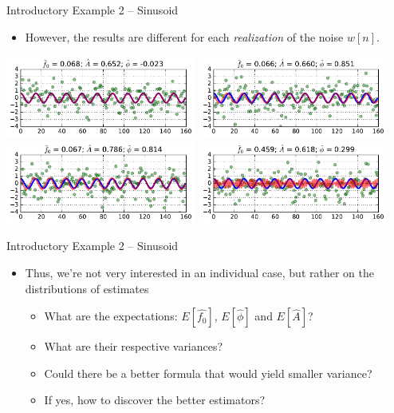 \documentclass[10pt, aspectratio=169]{beamer} %
\begin{document}
\begin{frame}{Introductory Example 2 -- Sinusoid}
 \begin{itemize}
\item However, the results are different for each \emph{realization} of the noise $w[n]$.
\end{itemize}
\begin{center}
\includegraphics[width=0.47\textwidth]{MLSinusoid1.pdf}\quad
\includegraphics[width=0.47\textwidth]{MLSinusoid2.pdf}\\
\includegraphics[width=0.47\textwidth]{MLSinusoid3.pdf}\quad
\includegraphics[width=0.47\textwidth]{MLSinusoid4.pdf}
\end{center}
\end{frame}

\begin{frame}[allowframebreaks=0.8]{Introductory Example 2 -- Sinusoid}
 \begin{itemize}


\item Thus, we're not very interested in an individual case, but rather on the distributions of estimates
 \begin{itemize}
 \item What are the expectations: $E[\hat{f_0}]$, $E[\hat{\phi}]$ and $E[\hat{A}]$?
 \item What are their respective variances?
 \item Could there be a better formula that would yield smaller variance?
 \item If yes, how to discover the better estimators?
\end{itemize}
\end{itemize}
\end{frame}
\end{document}
